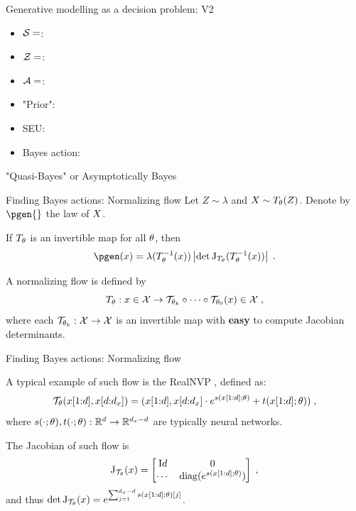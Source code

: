 \documentclass[10pt]{beamer}
\begin{document}
\begin{frame}{Generative modelling as a decision problem: V2}
  \begin{itemize}
    \setlength\itemsep{1.5em}
    \item $\mathcal{S} = $:
    \item $\mathcal{Z} = $:
    \item $\mathcal{A} = $:
    \item "Prior":
    \item SEU:
    \item Bayes action:
  \end{itemize}
\end{frame}
\begin{frame}{"Quasi-Bayes" or Asymptotically Bayes}

\end{frame}
\begin{frame}{Finding Bayes actions: Normalizing flow}
  Let $Z \sim \lambda$ and $X \sim T_{\theta}(Z)$. Denote by $\pgen{}$ the law of $X$.
  \pause

  If $T_{\theta}$ is an invertible map for all $\theta$, then
  \begin{equation}
      \pgen(\lstate) = \gendist(\nflow{\param}^{-1}(\lstate))\left|\det \jac{\nflow{\param}}(\nflow{\param}^{-1}(\lstate))\right| \eqsp.
  \end{equation}
  \pause

  A normalizing flow is defined by
  \begin{equation}
      \label{eq:nflow_def}
      T_{\theta}: x \in \mathcal{X} \rightarrow \mathcal{T}_{\theta_k}\circ \cdots \circ \mathcal{T}_{\theta_0}(x) \in \mathcal{X} \;,
  \end{equation}
  where each $\mathcal{T}_{\theta_k}: \mathcal{X} \rightarrow \mathcal{X}$ is an invertible map with \textbf{easy} to compute Jacobian determinants.   
\end{frame}
\begin{frame}{Finding Bayes actions: Normalizing flow}

  A typical example of such flow is the RealNVP \citep{dinh2017density}, defined as:
  \begin{equation}
      \label{eq:rnvp_def}
      \mathcal{T}_{\theta}(x[1{:}d], x[d{:}{d_x}]) = (x[1{:}d], x[d{:}{d_x}] \cdot e^{s(x[1{:}d]; \theta)} + t(x[1{:}d]; \theta)) \;,
  \end{equation}
  where $s(\cdot; \theta), t(\cdot; \theta): \mathbb{R}^d \rightarrow \mathbb{R}^{{d_x} - d}$ are typically neural networks.
  
  The Jacobian of such flow is
  \begin{equation}
      \label{eq:rnvp_jac}
      \mathrm{J}_{\mathcal{T}_{\theta}}(x) = \begin{bmatrix}
          \mathrm{I}{d} & 0 \\
          \cdots & \operatorname{diag}(e^{s(x[1{:}d]; \theta)})
      \end{bmatrix}\;,
  \end{equation}
  and thus $\det \mathrm{J}_{\mathcal{T}_{\theta}}(x) = e^{\sum_{j=1}^{{d_x} - d} s(x[1{:}d]; \theta)[j]}$.
\end{frame}
\end{document}
